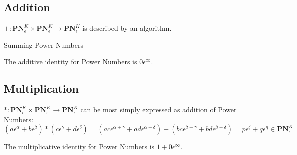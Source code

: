 \documentclass[acmsmall]{acmart}
\begin{document}
\subsection{Addition}
$+:\mathbf{PN}^K_\epsilon \times \mathbf{PN}^K_\epsilon \rightarrow \mathbf{PN}^K_\epsilon$ is described by an algorithm.

\begin{algorithm}[H]
	\SetAlgoLined
	
	\caption{Summing Power Numbers}	
\end{algorithm}

The additive identity for Power Numbers is $0\epsilon^\infty$.

\subsection{Multiplication}
$*:\mathbf{PN}^K_\epsilon \times \mathbf{PN}^K_\epsilon \rightarrow \mathbf{PN}^K_\epsilon$ can be most simply expressed as addition of Power Numbers:
\begin{displaymath}
(a\epsilon^\alpha + b\epsilon^\beta) * (c\epsilon^\gamma + d\epsilon^\delta)
= (ac\epsilon^{\alpha+\gamma} + ad\epsilon^{\alpha+\delta}) + (bc\epsilon^{\beta+\gamma}+ bd\epsilon^{\beta+\delta})
= p\epsilon^\zeta + q\epsilon^\eta \in \mathbf{PN}^K_\epsilon
\end{displaymath}

The multiplicative identity for Power Numbers is $1 + 0\epsilon^\infty$.
\end{document}
